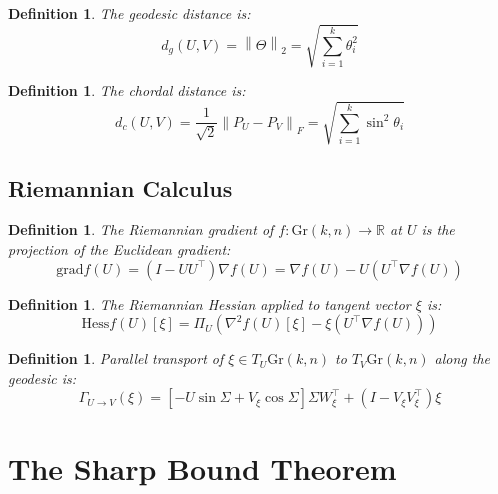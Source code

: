 \documentclass[11pt,a4paper]{article}
\newtheorem{definition}[theorem]{Definition}
\newcommand{\Gr}{\mathrm{Gr}}
\newcommand{\R}{\mathbb{R}}
\newcommand{\grad}{\mathrm{grad}}
\newcommand{\Hess}{\mathrm{Hess}}
\newcommand{\norm}[1]{\left\|#1\right\|}
\begin{document}
\begin{definition}
The \emph{geodesic distance} is:
\begin{equation}
    d_g(U,V) = \norm{\Theta}_2 = \sqrt{\sum_{i=1}^k \theta_i^2}
\end{equation}
\end{definition}

\begin{definition}
The \emph{chordal distance} is:
\begin{equation}
    d_c(U,V) = \frac{1}{\sqrt{2}}\norm{P_U - P_V}_F = \sqrt{\sum_{i=1}^k \sin^2\theta_i}
\end{equation}
\end{definition}

\subsection{Riemannian Calculus}

\begin{definition}
The \emph{Riemannian gradient} of $f: \Gr(k,n) \to \R$ at $U$ is the projection of the Euclidean gradient:
\begin{equation}
    \grad f(U) = (I - UU^\top) \nabla f(U) = \nabla f(U) - U(U^\top \nabla f(U))
\end{equation}
\end{definition}

\begin{definition}
The \emph{Riemannian Hessian} applied to tangent vector $\xi$ is:
\begin{equation}
    \Hess f(U)[\xi] = \Pi_U\left(\nabla^2 f(U)[\xi] - \xi (U^\top \nabla f(U))\right)
\end{equation}
\end{definition}

\begin{definition}
\emph{Parallel transport} of $\xi \in T_U\Gr(k,n)$ to $T_V\Gr(k,n)$ along the geodesic is:
\begin{equation}
    \Gamma_{U \to V}(\xi) = \left[-U\sin\Sigma + V_\xi\cos\Sigma\right]\Sigma W_\xi^\top + (I - V_\xi V_\xi^\top)\xi
\end{equation}
\end{definition}

\section{The Sharp Bound Theorem}
\label{sec:sharp-bound}
\end{document}
